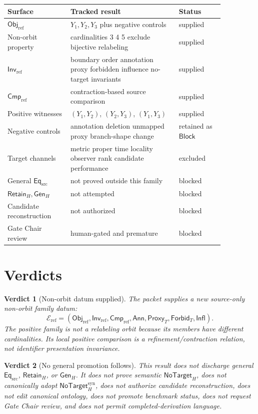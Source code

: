\documentclass[11pt]{article}
\newcommand{\EqSrc}{\mathsf{Eq}_{\mathrm{src}}}
\newcommand{\ObjRef}{\mathsf{Obj}_{\mathrm{ref}}}
\newcommand{\InvRef}{\mathsf{Inv}_{\mathrm{ref}}}
\newcommand{\CmpRef}{\mathsf{Cmp}_{\mathrm{ref}}}
\newcommand{\Ann}{\mathsf{Ann}}
\newcommand{\Proxy}{\mathsf{Proxy}_{T}}
\newcommand{\Forbid}{\mathsf{Forbid}_{T}}
\newcommand{\Infl}{\mathsf{Infl}}
\newcommand{\RetainH}{\mathsf{Retain}_{H}}
\newcommand{\GenH}{\mathsf{Gen}_{H}}
\newcommand{\NoTargetH}{\mathsf{NoTarget}_{H}}
\newcommand{\NoTargetSyn}{\mathsf{NoTarget}_{H}^{\mathrm{syn}}}
\newcommand{\Block}{\mathsf{Block}}
\newtheorem{verdict}{Verdict}
\begin{document}
\begin{center}
\begin{tabular}{p{0.25\linewidth}p{0.43\linewidth}p{0.18\linewidth}}
\textbf{Surface} & \textbf{Tracked result} & \textbf{Status} \\
\hline
\(\ObjRef\) & \(Y_{1},Y_{2},Y_{3}\) plus negative controls & supplied \\
Non-orbit property & cardinalities 3 4 5 exclude bijective relabeling & supplied \\
\(\InvRef\) & boundary order annotation proxy forbidden influence no-target invariants & supplied \\
\(\CmpRef\) & contraction-based source comparison & supplied \\
Positive witnesses & \((Y_{1},Y_{2})\), \((Y_{2},Y_{3})\), \((Y_{1},Y_{3})\) & supplied \\
Negative controls & annotation deletion unmapped proxy branch-shape change & retained as \(\Block\) \\
Target channels & metric proper time locality observer rank candidate performance & excluded \\
General \(\EqSrc\) & not proved outside this family & blocked \\
\(\RetainH,\GenH\) & not attempted & blocked \\
Candidate reconstruction & not authorized & blocked \\
Gate Chair review & human-gated and premature & blocked \\
\end{tabular}
\end{center}

\section{Verdicts}

\begin{verdict}[Non-orbit datum supplied]
The packet supplies a new source-only non-orbit family datum:
\[
    \mathcal{E}_{\mathrm{ref}}=
    (\ObjRef,\InvRef,\CmpRef,\Ann,\Proxy,\Forbid,\Infl).
\]
The positive family is not a relabeling orbit because its members have
different cardinalities. Its local positive comparison is a
refinement/contraction relation, not identifier presentation invariance.
\end{verdict}

\begin{verdict}[No general promotion follows]
This result does not discharge general \(\EqSrc\), \(\RetainH\), or
\(\GenH\). It does not prove semantic \(\NoTargetH\), does not canonically
adopt \(\NoTargetSyn\), does not authorize candidate reconstruction, does
not edit canonical ontology, does not promote benchmark status, does not
request Gate Chair review, and does not permit completed-derivation
language.
\end{verdict}
\end{document}
